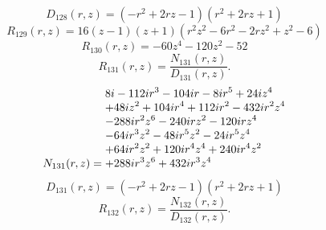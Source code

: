 \documentclass[11pt,a4paper]{article}
\begin{document}
\begin{equation}
D_{128}(r,z)=\left(- r^{2} + 2 r z - 1\right) \left(r^{2} + 2 r z + 1\right)
\label{eq:cat-denominator-128}
\end{equation}
\begin{equation}
R_{129}(r,z)=16 \left(z - 1\right) \left(z + 1\right) \left(r^{2} z^{2} - 6 r^{2} - 2 r z^{2} + z^{2} - 6\right)
\label{eq:cat-rational-129}
\end{equation}
\begin{equation}
R_{130}(r,z)=- 60 z^{4} - 120 z^{2} - 52
\label{eq:cat-rational-130}
\end{equation}
\begin{equation}
R_{131}(r,z)=\frac{N_{131}(r,z)}{D_{131}(r,z)}.
\label{eq:cat-rational-131}
\end{equation}
\begin{equation}
N_{131}(r,z)=\shortstack[l]{$\displaystyle 8 i - 112 i r^{3} - 104 i r - 8 i r^{5} + 24 i z^{4}$\\
$\displaystyle  + 48 i z^{2} + 104 i r^{4} + 112 i r^{2} - 432 i r^{2} z^{4}$\\
$\displaystyle  - 288 i r^{2} z^{6} - 240 i r z^{2} - 120 i r z^{4}$\\
$\displaystyle  - 64 i r^{3} z^{2} - 48 i r^{5} z^{2} - 24 i r^{5} z^{4}$\\
$\displaystyle  + 64 i r^{2} z^{2} + 120 i r^{4} z^{4} + 240 i r^{4} z^{2}$\\
$\displaystyle  + 288 i r^{3} z^{6} + 432 i r^{3} z^{4}$}
\label{eq:cat-numerator-131}
\end{equation}
\begin{equation}
D_{131}(r,z)=\left(- r^{2} + 2 r z - 1\right) \left(r^{2} + 2 r z + 1\right)
\label{eq:cat-denominator-131}
\end{equation}
\begin{equation}
R_{132}(r,z)=\frac{N_{132}(r,z)}{D_{132}(r,z)}.
\label{eq:cat-rational-132}
\end{equation}
\end{document}
